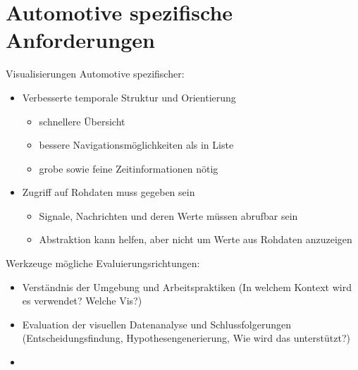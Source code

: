 \documentclass[draft=false
              ,paper=a4
              ,twoside=false
              ,fontsize=11pt
              ,headsepline
              ,BCOR10mm
              ,DIV11
              ]{scrbook}
\newcommand{\TODO}[1]{\colorbox{yellow}{\textcolor{red}{[TODO: #1]}}}
\begin{document}
\section{Automotive spezifische Anforderungen} %
\label{sec:automotive_spezifische_anforderungen}
Visualisierungen Automotive spezifischer:

\begin{itemize}
  \item Verbesserte temporale Struktur und Orientierung
    \begin{itemize}
    \item schnellere Übersicht
    \item bessere Navigationsmöglichkeiten als in Liste
    \item grobe sowie feine Zeitinformationen nötig
  \end{itemize}
  \item Zugriff auf Rohdaten muss gegeben sein
  \begin{itemize}
    \item Signale, Nachrichten und deren Werte müssen abrufbar sein
    \item Abstraktion kann helfen, aber nicht um Werte aus Rohdaten anzuzeigen
  \end{itemize}
\end{itemize}

Werkzeuge mögliche Evaluierungsrichtungen:

\begin{itemize}
  \item Verständnis der Umgebung und Arbeitspraktiken (In welchem Kontext wird es verwendet? Welche Vis?)
  \item Evaluation der visuellen Datenanalyse und Schlussfolgerungen (Entscheidungsfindung, Hypothesengenerierung, Wie wird das unterstützt?)
  \item 
\end{itemize}

\end{document}

